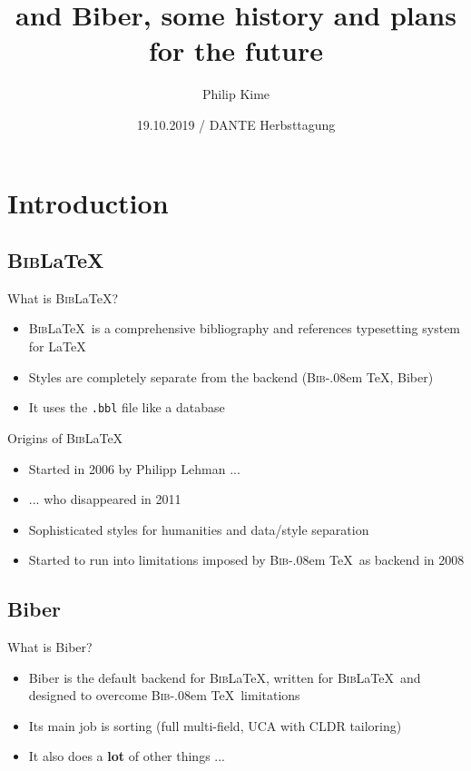 \documentclass[xcolor=dvipsnames]{beamer}
\title[\BibLaTeX and Biber]
{\BibLaTeX and Biber, some history and plans for the future}
\author{Philip Kime}
\date
{19.10.2019 / DANTE Herbsttagung}
\def\BibLaTeX{\textsc{Bib}\LaTeX}
\def\BibTeX{\textsc{Bib}\kern-.08em \TeX}
\begin{document}
\begin{frame}
  \titlepage
\end{frame}

\section*{Introduction}

\subsection*{\BibLaTeX}

\begin{frame}{What is \BibLaTeX?}{}
  \begin{itemize}
  \item \BibLaTeX\ is a comprehensive bibliography and references
    typesetting system for \LaTeX
  \item Styles are completely separate from the backend (\BibTeX, Biber)
  \item It uses the \texttt{.bbl} file like a database
  \end{itemize}
\end{frame}

\begin{frame}{Origins of \BibLaTeX}{}
  \begin{itemize}
  \item Started in 2006 by Philipp Lehman ...
  \item ... who disappeared in 2011
  \item Sophisticated styles for humanities and data/style separation
  \item Started to run into limitations imposed by \BibTeX\ as backend in 2008
  \end{itemize}
\end{frame}

\subsection*{Biber}

\begin{frame}{What is Biber?}
  \begin{itemize}
  \item Biber is the default backend for \BibLaTeX, written for \BibLaTeX\ 
    and designed to overcome \BibTeX\ limitations
  \item Its main job is sorting (full multi-field, UCA with CLDR tailoring)
  \item It also does a \textbf{lot} of other things ...
  \end{itemize}
\end{frame}
\end{document}
